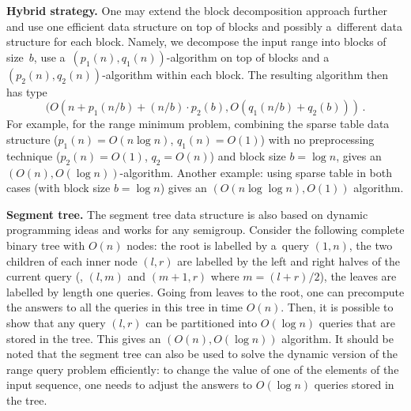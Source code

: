 \documentclass{toc}
\begin{document}
\textbf{Hybrid strategy.} One may extend the block decomposition
approach further and use one efficient data structure on top of
blocks and possibly a~different data structure for each block.
Namely, we decompose the input range into blocks of size~$b$,
use a~$(p_1(n), q_1(n))$-algorithm on top of blocks and
a~$(p_2(n), q_2(n))$-algorithm within each block. The resulting algorithm then
has type
\[(O(n + p_1(n / b) + (n / b) \cdot p_2(b), O(q_1(n/b) + q_2(b))) \, .\]
For example, for the range minimum problem, combining the sparse table data
structure ($p_1(n)=O(n\log n)$, $q_1(n)=O(1)$) with no preprocessing technique
($p_2(n)=O(1)$, $q_2=O(n)$) and block size $b=\log n$, gives
an~$(O(n), O(\log n))$-algorithm. Another example: using sparse table in both
cases (with block size $b=\log n$) gives an $(O(n\log\log n), O(1))$ algorithm.

%

\textbf{Segment tree.} The segment tree data structure is also based on dynamic
programming ideas and works for any semigroup. Consider the following complete
binary tree with $O(n)$ nodes: the root is labelled by a~query $(1,n)$, the two
children of each inner node $(l,r)$ are labelled by the left and right halves of
the current query (\ie, $(l,m)$ and $(m+1,r)$ where $m=(l+r)/2$), the leaves
are labelled by length one queries. Going from leaves to the root, one can
precompute the answers to all the queries in this tree in time $O(n)$. Then, it
is possible to show that any query $(l,r)$ can be  partitioned into $O(\log n)$
queries that are stored in the tree. This gives an $(O(n), O(\log n))$
algorithm. It should be noted that the segment tree can also be used to solve
the dynamic version of the
%
%
range query
problem efficiently: to change the
value of one of the elements of the input sequence, one needs to adjust the
answers to $O(\log n)$ queries stored in the tree.
\end{document}
